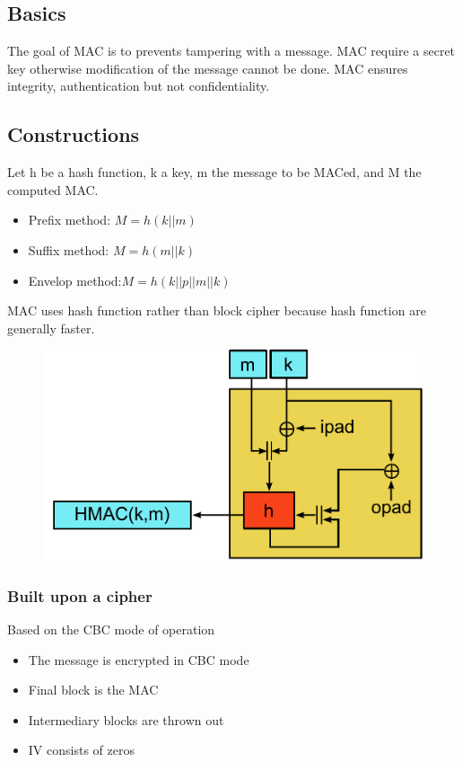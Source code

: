 
\subsection{Basics}
The goal of MAC is to prevents tampering with a message. MAC require a secret
key otherwise modification of the message cannot be done. MAC ensures integrity,
authentication but not confidentiality.

\subsection{Constructions}
Let h be a hash function, k a key, m the message to be MACed, and M the
computed MAC\@.
\begin{itemize}
    \item Prefix method: $ M = h(k||m) $
    \item Suffix method: $ M = h(m||k) $
    \item Envelop method:$ M = h(k||p||m||k) $
\end{itemize}
MAC uses hash function rather than block cipher because hash function are
generally faster.
\begin{figure}[ht!]
    \centering
    \includegraphics[scale=0.5]{img/hmac}
\end{figure}

\subsubsection{Built upon a cipher}
Based on the CBC mode of operation
\begin{itemize}
    \item The message is encrypted in CBC mode
    \item Final block is the MAC
    \item Intermediary blocks are thrown out
    \item IV consists of zeros
\end{itemize}

